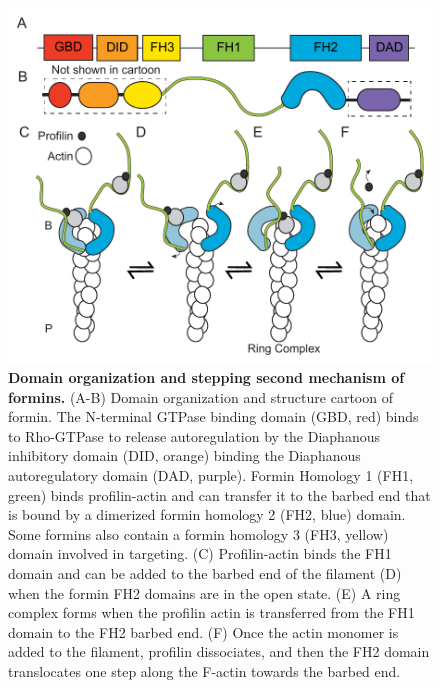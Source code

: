 \begin{figure}
\centering
\includegraphics[width=13cm]{img/ch01/formin_mech.pdf}
\caption[Domain organization and stepping second mechanism of formins.]{\textbf{Domain organization and stepping second mechanism of formins.} (A-B) Domain organization and structure cartoon of formin. The N-terminal GTPase binding domain (GBD, red) binds to Rho-GTPase to release autoregulation by the Diaphanous inhibitory domain (DID, orange) binding the Diaphanous autoregulatory domain (DAD, purple). Formin Homology 1 (FH1, green) binds profilin-actin and can transfer it to the barbed end that is bound by a dimerized formin homology 2 (FH2, blue) domain. Some formins also contain a formin homology 3 (FH3, yellow) domain involved in targeting. (C) Profilin-actin binds the FH1 domain and can be added to the barbed end of the filament (D) when the formin FH2 domains are in the open state. (E) A ring complex forms when the profilin actin is transferred from the FH1 domain to the FH2 barbed end. (F) Once the actin monomer is added to the filament, profilin dissociates, and then the FH2 domain translocates one step along the F-actin towards the barbed end.} 
\label{fig:formin-domain}
\end{figure}

